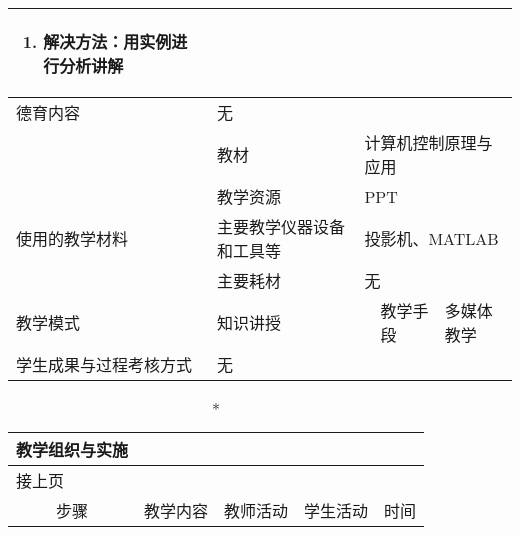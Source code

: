 {\begin{longtable}{|m{20mm}|m{20mm}|m{20mm}|m{20mm}|m{20mm}|m{28mm}|}
{\begin{enumerate}
\item 解决方法：用实例进行分析讲解
\end{enumerate}}\\
\hline
\centering 德育内容 &\multicolumn{5}{m{108mm}|}{无}\\
\hline
 &教材 & \multicolumn{4}{m{88mm}|}{计算机控制原理与应用}\\
\cline{2-6}& 教学资源 &\multicolumn{4}{m{88mm}|}{PPT}\\
\cline{2-6}\centering 使用的教学材料& 主要教学仪器设备和工具等 &\multicolumn{4}{m{88mm}|}{投影机、MATLAB}\\
\cline{2-6}& 主要耗材 &\multicolumn{4}{m{88mm}|}{无}\\
\hline
\centering 教学模式 &\multicolumn{2}{m{40mm}|}{知识讲授}&\centering 教学手段 &\multicolumn{2}{m{48mm}|}{多媒体教学}\\
\hline
\centering 学生成果与过程考核方式 &\multicolumn{5}{m{108mm}|}{无}
\end{longtable}
\clearpage

\begin{landscape}

\begin{longtable}{|m{10mm}|m{50mm}|m{50mm}|m{50mm}|m{15mm}|}
\caption*{\huge 教学组织与实施}\\
\hline
\endfirsthead
\multicolumn{5}{l}{\small 接上页}\\
\hline
\multicolumn{1}{|c|}{步骤}&\multicolumn{1}{c|}{教学内容}&\multicolumn{1}{c|}{教师活动}&\multicolumn{1}{c|}{学生活动}&\multicolumn{1}{c|}{时间}\\
\hline
\endhead


\end{longtable}
\end{landscape}}
